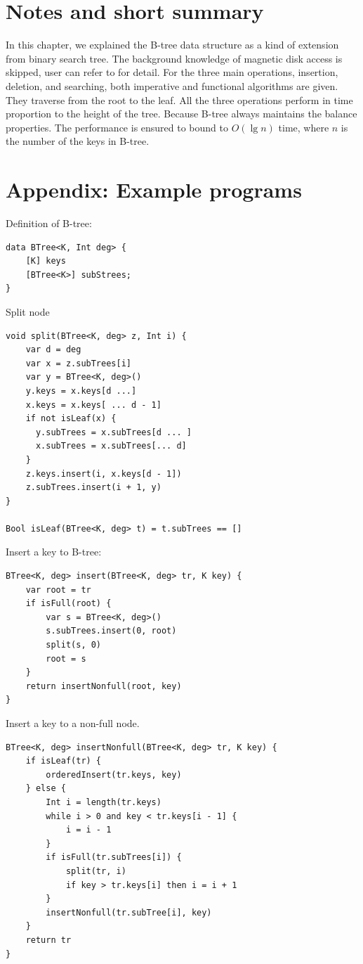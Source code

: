 \documentclass[b5paper]{article}
\begin{document}
\section{Notes and short summary}
In this chapter, we explained the B-tree data structure as a kind of
extension from binary search tree. The background knowledge of
magnetic disk access is skipped, user can refer to \cite{CLRS}
for detail. For the three main operations, insertion, deletion,
and searching, both imperative and functional algorithms are
given. They traverse from the root to the leaf. All the three
operations perform in time proportion to the height of the tree.
Because B-tree always maintains the balance properties. The
performance is ensured to bound to $O(\lg n)$ time,
where $n$ is the number of the keys in B-tree.


\section{Appendix: Example programs}

Definition of B-tree:

\begin{lstlisting}[language = Bourbaki]
data BTree<K, Int deg> {
    [K] keys
    [BTree<K>] subStrees;
}
\end{lstlisting}

Split node

\begin{lstlisting}[language = Bourbaki]
void split(BTree<K, deg> z, Int i) {
    var d = deg
    var x = z.subTrees[i]
    var y = BTree<K, deg>()
    y.keys = x.keys[d ...]
    x.keys = x.keys[ ... d - 1]
    if not isLeaf(x) {
      y.subTrees = x.subTrees[d ... ]
      x.subTrees = x.subTrees[... d]
    }
    z.keys.insert(i, x.keys[d - 1])
    z.subTrees.insert(i + 1, y)
}

Bool isLeaf(BTree<K, deg> t) = t.subTrees == []
\end{lstlisting}

Insert a key to B-tree:

\begin{lstlisting}[language = Bourbaki]
BTree<K, deg> insert(BTree<K, deg> tr, K key) {
    var root = tr
    if isFull(root) {
        var s = BTree<K, deg>()
        s.subTrees.insert(0, root)
        split(s, 0)
        root = s
    }
    return insertNonfull(root, key)
}
\end{lstlisting}

Insert a key to a non-full node.

\begin{lstlisting}[language = Bourbaki]
BTree<K, deg> insertNonfull(BTree<K, deg> tr, K key) {
    if isLeaf(tr) {
        orderedInsert(tr.keys, key)
    } else {
        Int i = length(tr.keys)
        while i > 0 and key < tr.keys[i - 1] {
            i = i - 1
        }
        if isFull(tr.subTrees[i]) {
            split(tr, i)
            if key > tr.keys[i] then i = i + 1
        }
        insertNonfull(tr.subTree[i], key)
    }
    return tr
}
\end{lstlisting}
\end{document}
